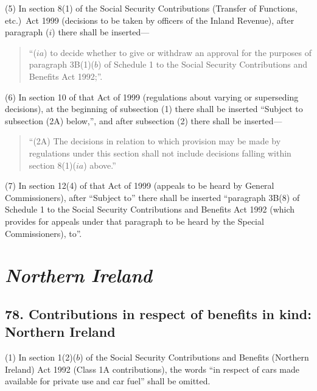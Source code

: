 \documentclass[12pt,a4paper]{article}
\begin{document}
(5) In section 8(1)  of the Social Security Contributions (Transfer of Functions, etc.)\ Act 1999 (decisions to be taken by officers of the Inland Revenue), after paragraph ($i$)  there shall be inserted—
\begin{quotation}
“($ia$) to decide whether to give or withdraw an approval for the purposes of paragraph 3B(1)($b$)  of Schedule 1 to the Social Security Contributions and Benefits Act 1992;”.
\end{quotation}

(6) In section 10 of that Act of 1999 (regulations about varying or superseding decisions), at the beginning of subsection (1)  there shall be inserted “Subject to subsection (2A)  below,”, and after subsection (2)  there shall be inserted—
\begin{quotation}
“(2A) The decisions in relation to which provision may be made by regulations under this section shall not include decisions falling within section 8(1)($ia$) above.”
\end{quotation}

(7) In section 12(4)  of that Act of 1999 (appeals to be heard by General Commissioners), after “Subject to” there shall be inserted “paragraph 3B(8)  of Schedule 1 to the Social Security Contributions and Benefits Act 1992 (which provides for appeals under that paragraph to be heard by the Special Commissioners), to”.

\section{\itshape Northern Ireland}

\subsection{78. Contributions in respect of benefits in kind: Northern Ireland}

(1) In section 1(2)($b$)  of the Social Security Contributions and Benefits (Northern Ireland) Act 1992 (Class 1A contributions), the words “in respect of cars made available for private use and car fuel” shall be omitted.
\end{document}
